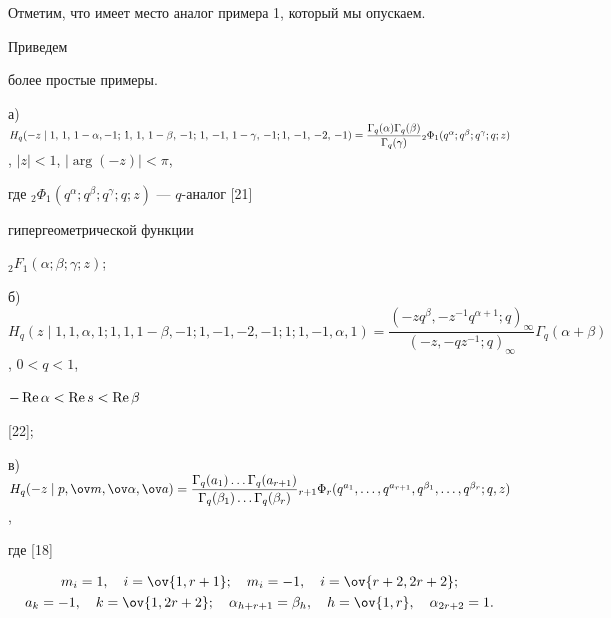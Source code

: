 Отметим, что имеет место аналог примера 1, который мы опускаем. 


Приведем 


более простые примеры. 


 


\begin{exam} 


 


а) $H_q(-z\mid1,\,1,\,1-\alpha,-1;\,1,\,1,\,1-\beta,\,-1;\, 1,\,


-1,\,1-\gamma,\, -1; 


1,\,-1,\,-2,\,-1)= \linebreak


\dfrac{\Gamma_q(\alpha)\Gamma_q(\beta)}{\Gamma_q(\gamma)} 


{}_2\Phi_1(q^\alpha;q^\beta;q^\gamma;q;z)$, $|z|<1$, $|\arg(-z)|<\pi$, 


где ${}_2\Phi_1(q^\alpha;q^\beta;q^\gamma;q;z)$ --- $q$-аналог [21] 


гипергеометрической функции 


${}_2F_1(\alpha;\beta;\gamma;z)$; 


 


б) $H_q(z\mid 1,1,\alpha,1;1,1,1-\beta,-1; 1,-1,-2,-1; 1; 


1,-1,\alpha,1)= 


\dfrac{(-z q^\beta,-z^{-1}q^{\alpha+1};q)_\infty} 


{(-z,-q z^{-1};q)_{\infty}}\Gamma_q(\alpha+\beta)$, $0<q<1$, 


$-\operatorname{Re}\alpha<\operatorname{Re} s<\operatorname{Re}\beta$ 


[22]; 


 


в) $H_q(-z\mid p,\ov m,\ov\alpha,\ov a)= 


\dfrac{\Gamma_q(a_1)\dotsc\Gamma_q(a_{r+1})} 


{\Gamma_q(\beta_1)\dotsc\Gamma_q(\beta_r)} 


{}_{r+1}\Phi_r(q^{a_1},\dotsc,q^{a_{r+1}}, 


q^{\beta_1},\dotsc,q^{\beta_r};q,z)$, 


где [18] 


\begin{gather*} 


m_i=1,\quad i=\ov{1,r+1};\quad m_i=-1,\quad 


i=\ov{r+2,2r+2};\\ 


a_k=-1,\quad k=\ov{1,2r+2};\quad 


\alpha_{h+r+1}=\beta_h,\quad h=\ov{1,r},\quad 


\alpha_{2r+2}=1. 


\end{gather*} 


\end{exam} 


